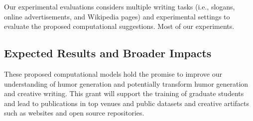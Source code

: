 Our experimental evaluations considers multiple writing tasks (i.e., slogans, online advertisements, and Wikipedia pages) and experimental settings to evaluate the proposed computational suggestions.
Most of our experiments.


\subsection{Expected Results and Broader Impacts}


 These proposed computational models hold the promise to improve our understanding of humor generation and potentially transform humor generation and creative writing. This grant will support the training of graduate students and lead to publications in top venues and public datasets and creative artifacts such as websites and open source repositories.
